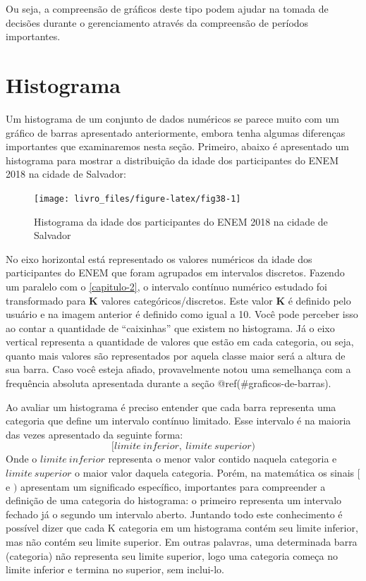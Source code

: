 \documentclass[
]{book}
\begin{document}
Ou seja, a compreensão de gráficos deste tipo podem ajudar na tomada de decisões durante o gerenciamento através da compreensão de períodos importantes.

\hypertarget{histograma}{%
\section{Histograma}\label{histograma}}

Um histograma de um conjunto de dados numéricos se parece muito com um gráfico de barras apresentado anteriormente, embora tenha algumas diferenças importantes que examinaremos nesta seção. Primeiro, abaixo é apresentado um histograma para mostrar a distribuição da idade dos participantes do ENEM 2018 na cidade de Salvador:

\begin{figure}

{\centering \texttt{[image: livro\_files/figure-latex/fig38-1]} 

}

\caption{Histograma da idade dos participantes do ENEM 2018 na cidade de Salvador}\label{fig:fig38}
\end{figure}

No eixo horizontal está representado os valores numéricos da idade dos participantes do ENEM que foram agrupados em intervalos discretos. Fazendo um paralelo com o \ref{capitulo-2}, o intervalo contínuo numérico estudado foi transformado para \textbf{K} valores categóricos/discretos. Este valor \textbf{K} é definido pelo usuário e na imagem anterior é definido como igual a 10. Você pode perceber isso ao contar a quantidade de ``caixinhas'' que existem no histograma. Já o eixo vertical representa a quantidade de valores que estão em cada categoria, ou seja, quanto mais valores são representados por aquela classe maior será a altura de sua barra. Caso você esteja afiado, provavelmente notou uma semelhança com a frequência absoluta apresentada durante a seção @ref(\#graficos-de-barras).

Ao avaliar um histograma é preciso entender que cada barra representa uma categoria que define um intervalo contínuo limitado. Esse intervalo é na maioria das vezes apresentado da seguinte forma:
\[[limite\ inferior,\ limite\ superior)\]
Onde o \(limite\ inferior\) representa o menor valor contido naquela categoria e \(limite\ superior\) o maior valor daquela categoria. Porém, na matemática os sinais \([\) e \()\) apresentam um significado específico, importantes para compreender a definição de uma categoria do histograma: o primeiro representa um intervalo fechado já o segundo um intervalo aberto. Juntando todo este conhecimento é possível dizer que cada K categoria em um histograma contém seu limite inferior, mas não contém seu limite superior. Em outras palavras, uma determinada barra (categoria) não representa seu limite superior, logo uma categoria começa no limite inferior e termina no superior, sem inclui-lo.
\end{document}
